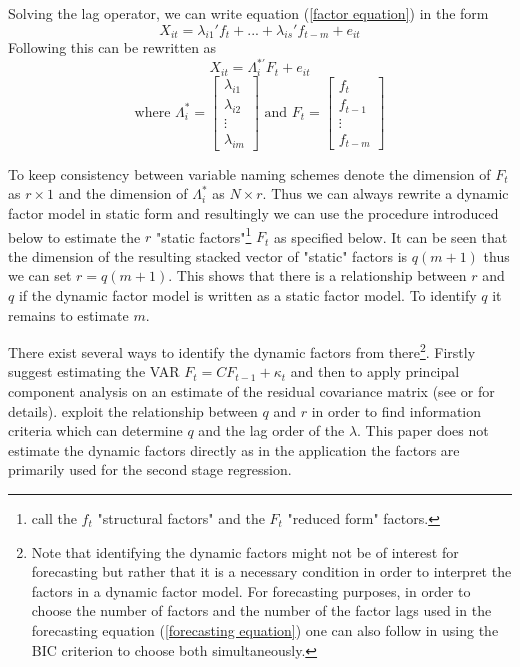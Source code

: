 \documentclass[11pt]{article}
\begin{document}
Solving the lag operator, we can write equation (\ref{factor equation}) in the form 
\begin{equation}
	\label{factor equation, solved lag polynomial}
	X_{it} = \lambda_{i1}' f_t + ... + \lambda_{is}' f_{t-m} + e_{it}
\end{equation}
Following \citet{bai2002determining} this can be rewritten as 
$$X_{it} = \Lambda_i^{*'} F_t + e_{it}$$
$$\text{where } \Lambda_i^* = \begin{bmatrix} \lambda_{i1} \\ \lambda_{i2} \\ \vdots \\ \lambda_{im} \end{bmatrix} \text{ and } F_t = \begin{bmatrix} f_t \\ f_{t-1} \\ \vdots \\ f_{t-m} \end{bmatrix}$$

To keep consistency between variable naming schemes denote the dimension of $F_t$ as $r \times 1$ and the dimension of $\Lambda_i^*$ as $N \times r$. Thus we can always rewrite a dynamic factor model in static form and resultingly we can use the procedure introduced below to estimate the $r$ "static factors"\footnote{\citet{breitung2004identification} call the $f_t$ "structural factors" and the $F_t$ "reduced form" factors.} $F_t$ as specified below.
It can be seen that the dimension of the resulting stacked vector of "static" factors is $q(m+1)$ thus we can set $r=q(m+1)$. This shows that there is a relationship between $r$ and $q$ if the dynamic factor model is written as a static factor model. To identify $q$ it remains to estimate $m$.

There exist several ways to identify the dynamic factors from there\footnote{Note that identifying the dynamic factors might not be of interest for forecasting but rather that it is a necessary condition in order to interpret the factors in a dynamic factor model. For forecasting purposes, in order to choose the number of factors and the number of the factor lags used in the forecasting equation (\ref{forecasting equation}) one can also follow \citet{bai2008forecasting} in using the BIC criterion to choose both simultaneously. }. Firstly \citet{giannone2002tracking} suggest estimating the VAR $F_t = C F_{t-1} + \kappa_t$ and then to apply principal component analysis on an estimate of the residual covariance matrix (see \citet{breitung2004identification} or \citet{giannone2002tracking} for details). \citet{breitung2004identification} exploit the relationship between $q$ and $r$ in order to find information criteria which can determine $q$ and the lag order of the $\lambda$. This paper does not estimate the dynamic factors directly as in the application the factors are primarily used for the second stage regression. \\
\end{document}
